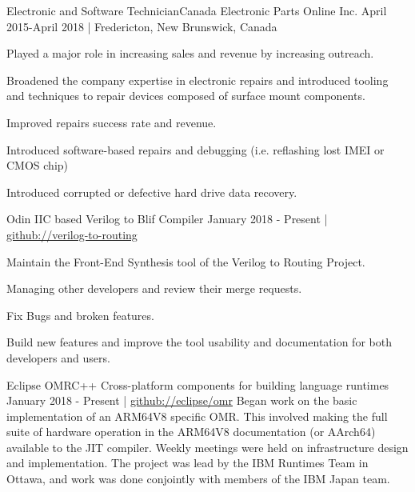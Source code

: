 \documentclass[english,letterpaper,12pt]{deedy-resume-openfont}
\begin{document}
    \employement%
        {Electronic and Software Technician}{Canada Electronic Parts Online Inc.}
        {April 2015-April 2018 | Fredericton, New Brunswick, Canada}{%
        \begin{tightemize}
        \item Played a major role in increasing sales and revenue by increasing outreach.
        \item Broadened the company expertise in electronic repairs and introduced tooling and techniques to repair devices composed of surface mount components.
        \item Improved repairs success rate and revenue.
        \item Introduced software-based repairs and debugging (i.e. reflashing lost IMEI or CMOS chip)
        \item Introduced corrupted or defective hard drive data recovery.
        \end{tightemize}
        }


    \employement%
        {Odin II}{C based Verilog to Blif Compiler}
        {January 2018 - Present | \href{https://github.com/verilog-to-routing/vtr-verilog-to-routing/graphs/contributors}{github://verilog-to-routing}}{%
        Maintain the Front-End Synthesis tool of the Verilog to Routing Project.
        \begin{tightemize}
        \item Managing other developers and review their merge requests.
        \item Fix Bugs and broken features.
        \item Build new features and improve the tool usability and documentation for both developers and users.
        \end{tightemize}
        }

    \employement%
        {Eclipse OMR}{C++ Cross-platform components for building language runtimes}
        {January 2018 - Present | \href{https://github.com/eclipse/omr}{github://eclipse/omr}}{%
        Began work on the basic implementation of an ARM64V8 specific OMR. 
        This involved making the full suite of hardware operation in the ARM64V8 documentation (or AArch64) available to the JIT compiler. 
        Weekly meetings were held on infrastructure design and implementation. 
        The project was lead by the IBM Runtimes Team in Ottawa, and work was done conjointly with members of the IBM Japan team.
        }
\end{document}
